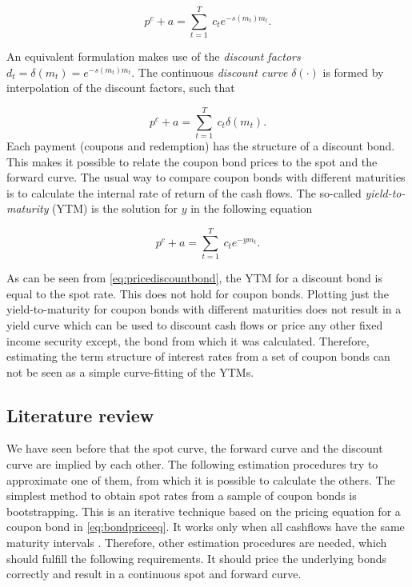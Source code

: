 \begin{equation}
  \label{eq:bondpriceeq}
  p^c+a = \sum_{t=1}^T \ c_t e^{-s(m_t)m_t}.
\end{equation}

An equivalent formulation makes use of the \emph{discount factors} $d_t=\delta(m_t)=e^{-s(m_t)m_t}$. The continuous \emph{discount curve} $\delta(\cdot)$ is formed by interpolation of the discount factors, such that


\begin{equation*}
  \label{bondprceq2}
  p^c+a=\sum_{t=1}^T \ c_t \delta(m_t). 
\end{equation*}
Each payment (coupons and redemption) has the structure of a discount bond. This makes it possible to relate the coupon bond prices to the spot and the forward curve. The usual way to compare coupon bonds with different maturities is to calculate the internal rate of return of the cash flows. The so-called \emph{yield-to-maturity} (YTM) is the solution for $y$ in the following equation

\begin{equation}
   \label{eq:yield}
   p^c+a=\sum_{t=1}^T \ c_t e^{-ym_t}.
 \end{equation}

As can be seen from \eqref{eq:pricediscountbond}, the YTM for a discount bond is equal to the spot rate. This does not hold for coupon bonds. Plotting just the yield-to-maturity for coupon bonds with different maturities does not result in a yield curve which can be used to discount cash flows or price any other fixed income security except, the bond from which it was calculated. Therefore, estimating the term structure of interest rates from a set of coupon bonds can not be seen as a simple curve-fitting of the YTMs.

\subsection{Literature review}

We have seen before that the spot curve, the forward curve and the discount curve are implied by each other. The following estimation procedures try to approximate one of them, from which it is possible to calculate the others. The simplest method to obtain spot rates from a sample of coupon bonds is bootstrapping. This is an iterative technique based on the pricing equation for a coupon bond in \eqref{eq:bondpriceeq}. It works only when all cashflows have the same maturity intervals \citep[see, e.g.][]{Hagan2006}. Therefore, other estimation procedures are needed, which should fulfill the following requirements. It should price the underlying bonds correctly and result in a continuous spot and forward curve. 

